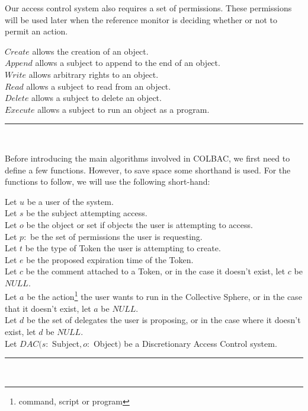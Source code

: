 \noindent Our access control system also requires a set of permissions. These
permissions will be used later when the reference monitor is deciding whether or
not to permit an action.

\begin{definition}\label{def:permissions}
$Create$ allows the creation of an object.\\
$Append$ allows a subject to append to the end of an object.\\
$Write$ allows arbitrary rights to an object. \\
$Read$ allows a subject to read from an object.\\
$Delete$ allows a subject to delete an object. \\
$Execute$ allows a subject to run an object as a program.\\
\hrule \mbox{}\\
\end{definition}

\noindent Before introducing the main algorithms involved in COLBAC, we first
need to define a few functions. However, to save space some shorthand is used.
For the functions to follow, we will use the following short-hand:

\begin{definition}
Let $u$ be a user of the system.\\
Let $s$ be the subject attempting access.\\
Let $o$ be the object or set if objects the user is attempting to access.\\
Let $p:$ be the set of permissions the user is requesting.\\
Let $t$ be the type of Token the user is attempting to create.\\
Let $e$ be the proposed expiration time of the Token.\\
Let $c$ be the comment attached to a Token, or in the case it doesn't exist,
let $c$ be $NULL$.\\
Let $a$ be the action\footnote{command, script or program} the user wants to run
in the Collective Sphere, or in the case that it doesn't exist, let $a$ be 
$NULL$.\\
Let $d$ be the set of delegates the user is proposing, or in the case where it
doesn't exist, let $d$ be $NULL$.\\
Let $DAC(s :$ Subject$, o:$ Object$)$ be a Discretionary Access Control
system.\\
\hrule \mbox{}\\
\end{definition}

